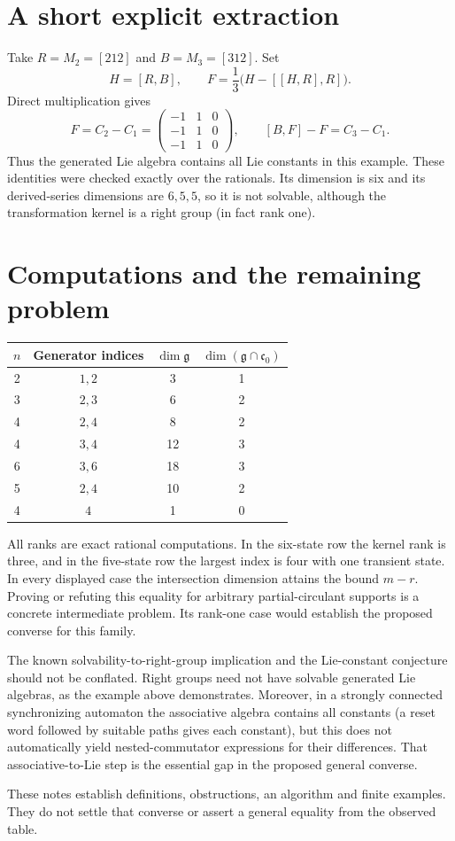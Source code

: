 \section{A short explicit extraction}
\begin{example}
Take $R=M_2=[212]$ and $B=M_3=[312]$. Set
\[
 H=[R,B],\qquad F=\frac13\bigl(H-[[H,R],R]\bigr).
\]
Direct multiplication gives
\[
 F=C_2-C_1=\begin{pmatrix}-1&1&0\\-1&1&0\\-1&1&0\end{pmatrix},
 \qquad [B,F]-F=C_3-C_1.
\]
Thus the generated Lie algebra contains all Lie constants in this example.
These identities were checked exactly over the rationals.
Its dimension is six and its derived-series dimensions are $6,5,5$,
so it is not solvable, although the transformation kernel is a right group
(in fact rank one).
\end{example}

\section{Computations and the remaining problem}
\begin{center}
\begin{tabular}{cccc}
\hline
$n$ & Generator indices & $\dim\mathfrak g$ & $\dim(\mathfrak g\cap\mathfrak c_0)$\\
\hline
2 & $1,2$ & 3 & 1\\
3 & $2,3$ & 6 & 2\\
4 & $2,4$ & 8 & 2\\
4 & $3,4$ & 12 & 3\\
6 & $3,6$ & 18 & 3\\
5 & $2,4$ & 10 & 2\\
4 & $4$ & 1 & 0\\
\hline
\end{tabular}
\end{center}
All ranks are exact rational computations. In the six-state row the kernel
rank is three, and in the five-state row the largest index is four with
one transient state. In every displayed case the intersection dimension
attains the bound $m-r$. Proving or refuting this equality for arbitrary
partial-circulant supports is a concrete intermediate problem. Its rank-one
case would establish the proposed converse for this family.

The known solvability-to-right-group implication and the Lie-constant
conjecture should not be conflated. Right groups need not have solvable
generated Lie algebras, as the example above demonstrates. Moreover, in a
strongly connected synchronizing automaton the associative algebra contains
all constants (a reset word followed by suitable paths gives each constant),
but this does not automatically yield nested-commutator expressions for their
differences. That associative-to-Lie step is the essential gap in the
proposed general converse.

These notes establish definitions, obstructions, an algorithm and finite
examples. They do not settle that converse or assert a general equality
from the observed table.

